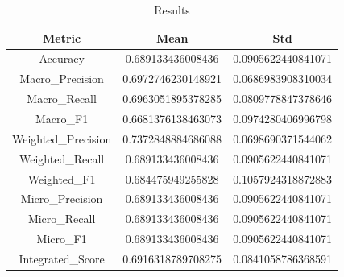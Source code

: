 \begin{table}[htbp]
\centering
\caption{Results}
\label{tab:csv}
\small
\setlength{\tabcolsep}{4pt}
\begin{tabular}{|c|c|c|}
\hline
Metric & Mean & Std \\
\hline
Accuracy & 0.689133436008436 & 0.0905622440841071 \\
Macro_Precision & 0.6972746230148921 & 0.0686983908310034 \\
Macro_Recall & 0.6963051895378285 & 0.0809778847378646 \\
Macro_F1 & 0.6681376138463073 & 0.0974280406996798 \\
Weighted_Precision & 0.7372848884686088 & 0.0698690371544062 \\
Weighted_Recall & 0.689133436008436 & 0.0905622440841071 \\
Weighted_F1 & 0.684475949255828 & 0.1057924318872883 \\
Micro_Precision & 0.689133436008436 & 0.0905622440841071 \\
Micro_Recall & 0.689133436008436 & 0.0905622440841071 \\
Micro_F1 & 0.689133436008436 & 0.0905622440841071 \\
Integrated_Score & 0.6916318789708275 & 0.0841058786368591 \\
\hline
\end{tabular}
\end{table}